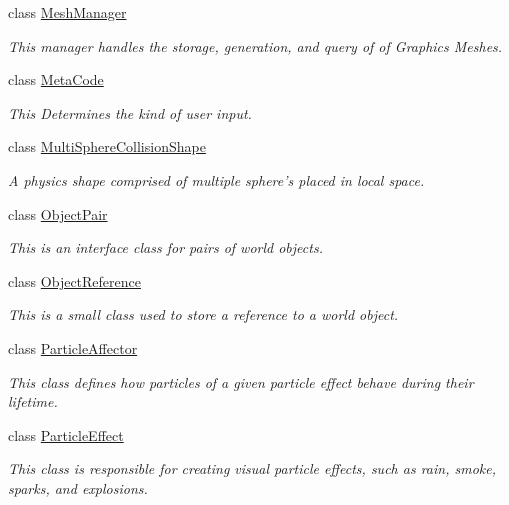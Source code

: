 \begin{DoxyCompactItemize}
class \hyperlink{classMezzanine_1_1MeshManager}{MeshManager}
\begin{DoxyCompactList}\small\item\em This manager handles the storage, generation, and query of of Graphics Meshes. \item\end{DoxyCompactList}\item 
class \hyperlink{classMezzanine_1_1MetaCode}{MetaCode}
\begin{DoxyCompactList}\small\item\em This Determines the kind of user input. \item\end{DoxyCompactList}\item 
class \hyperlink{classMezzanine_1_1MultiSphereCollisionShape}{MultiSphereCollisionShape}
\begin{DoxyCompactList}\small\item\em A physics shape comprised of multiple sphere's placed in local space. \item\end{DoxyCompactList}\item 
class \hyperlink{classMezzanine_1_1ObjectPair}{ObjectPair}
\begin{DoxyCompactList}\small\item\em This is an interface class for pairs of world objects. \item\end{DoxyCompactList}\item 
class \hyperlink{classMezzanine_1_1ObjectReference}{ObjectReference}
\begin{DoxyCompactList}\small\item\em This is a small class used to store a reference to a world object. \item\end{DoxyCompactList}\item 
class \hyperlink{classMezzanine_1_1ParticleAffector}{ParticleAffector}
\begin{DoxyCompactList}\small\item\em This class defines how particles of a given particle effect behave during their lifetime. \item\end{DoxyCompactList}\item 
class \hyperlink{classMezzanine_1_1ParticleEffect}{ParticleEffect}
\begin{DoxyCompactList}\small\item\em This class is responsible for creating visual particle effects, such as rain, smoke, sparks, and explosions. \item\end{DoxyCompactList}\item 

\end{DoxyCompactItemize}
